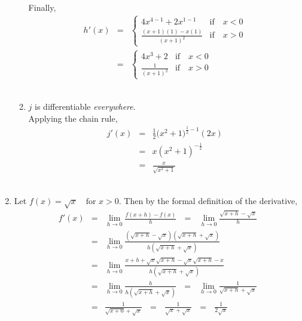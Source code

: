 \documentclass[12pt]{amsart}
\begin{document}
\begin{enumerate}
\begin{enumerate}
			Finally,
				\begin{eqnarray}
					h'(x) & = &
					\begin{cases}
						4x^{4-1}+2x^{1-1} & \text{if } \text{ } x<0 \\
						\frac{(x+1)(1)-x(1)}{(x+1)^2} &  \text{if } \text{ } x>0 \nonumber
					\end{cases} \\
					& = &
					\begin{cases}
						4x^3 +2 & \text{if } \text{ } x<0 \\
						\frac{1}{(x+1)^2} & \text{if } \text{ } x>0 \nonumber
					\end{cases}
				\end{eqnarray} \\
			
			\item $j$ is differentiable \emph{everywhere}. \\
			Applying the chain rule,
				\begin{eqnarray}
					j'(x) & = & \frac{1}{2}\big(x^2+1\big)^{\frac{1}{2}-1}(2x) \nonumber \\
					& = & x(x^2+1)^{-\frac{1}{2}} \nonumber \\
					& = & \frac{x}{\sqrt{x^2+1}} \nonumber
				\end{eqnarray} \\
			
		\end{enumerate}
		
	\item Let $f(x) = \sqrt{x} \text{ } \text{ for } x>0$. Then by the formal definition of the derivative,
		\begin{eqnarray}
			f'(x) & = &  \lim_{h\rightarrow0} \frac{f(x+h)-f(x)}{h} \text{ } = \text{ } \lim_{h\rightarrow0} 
			\frac{\sqrt{x+h}-\sqrt{x}}{h} \nonumber \\
			& = &  \lim_{h\rightarrow0} \frac{(\sqrt{x+h}-\sqrt{x})(\sqrt{x+h}+\sqrt{x})}{h(\sqrt{x+h}+\sqrt{x})} 
			\nonumber \\
			& = & \lim_{h\rightarrow0} \frac{x+h+\sqrt{x}\sqrt{x+h}-\sqrt{x}\sqrt{x+h}-x}{h(\sqrt{x+h}+
			\sqrt{x})} \nonumber \\
			& = & \lim_{h\rightarrow0} \frac{h}{h(\sqrt{x+h}+\sqrt{x})} \text{ } = \text{ } \lim_{h\rightarrow0} 				\frac{1}{\sqrt{x+h}+\sqrt{x}}\nonumber \\
			& = & \frac{1}{\sqrt{x+0}+\sqrt{x}}  \text{ } = \text{ } \frac{1}{\sqrt{x}+\sqrt{x}}\text{ } = \text{ } 
			\frac{1}{2\sqrt{x}} \nonumber 
		\end{eqnarray} \\
						

\end{enumerate}
\end{document}
